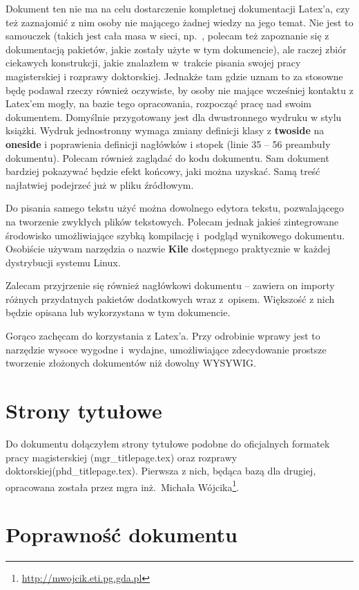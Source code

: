 \documentclass[twoside,a4paper]{book}
\begin{document}
Dokument ten nie ma na celu dostarczenie kompletnej dokumentacji Latex'a, czy też zaznajomić z nim osoby nie mającego żadnej wiedzy na jego temat. Nie jest to samouczek (takich jest cała masa w sieci, np.~\cite{wikibooks}, polecam też zapoznanie się z dokumentacją pakietów, jakie zostały użyte w tym dokumencie), ale raczej zbiór ciekawych konstrukcji, jakie znalazłem w~trakcie pisania swojej pracy magisterskiej i rozprawy doktorskiej. Jednakże tam gdzie uznam to za stosowne będę podawał rzeczy również oczywiste, by osoby nie mające wcześniej kontaktu z Latex'em mogły, na bazie tego opracowania, rozpocząć pracę nad swoim dokumentem. Domyślnie przygotowany jest dla dwustronnego wydruku w stylu książki. Wydruk jednostronny wymaga zmiany definicji klasy z \textbf{twoside} na \textbf{oneside} i poprawienia definicji nagłówków i stopek (linie 35 -- 56 preambuły dokumentu). Polecam również zaglądać do kodu dokumentu. Sam dokument bardziej pokazywać będzie efekt końcowy, jaki można uzyskać. Samą treść najłatwiej podejrzeć już w pliku źródłowym.

Do pisania samego tekstu użyć można dowolnego edytora tekstu, pozwalającego na tworzenie zwykłych plików tekstowych. Polecam jednak jakieś zintegrowane środowisko umożliwiające szybką kompilację i~podgląd wynikowego dokumentu. Osobiście używam narzędzia o nazwie \textbf{Kile} dostępnego praktycznie w każdej dystrybucji systemu Linux.

Zalecam przyjrzenie się również nagłówkowi dokumentu -- zawiera on importy różnych przydatnych pakietów dodatkowych wraz z~opisem. Większość z nich będzie opisana lub wykorzystana w tym dokumencie.

Gorąco zachęcam do korzystania z Latex'a. Przy odrobinie wprawy jest to narzędzie wysoce wygodne i~wydajne, umożliwiające zdecydowanie prostsze tworzenie złożonych dokumentów niż dowolny WYSYWIG\@.

\section{Strony tytułowe}

Do dokumentu dołączyłem strony tytułowe podobne do oficjalnych formatek pracy magisterskiej (mgr\_titlepage.tex) oraz rozprawy doktorskiej(phd\_titlepage.tex). Pierwsza z nich, będąca bazą dla drugiej, opracowana została przez mgra inż.\ Michała Wójcika\footnote{\url{http://mwojcik.eti.pg.gda.pl}}.

\section{Poprawność dokumentu}
\end{document}

